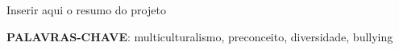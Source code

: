 
\setlength{\absparsep}{18pt} %
\begin{resumo}
	Inserir aqui o resumo do projeto
	
	\textbf{PALAVRAS-CHAVE}: multiculturalismo, preconceito, diversidade, bullying
\end{resumo}


\listoffigures*
\clearpage


\tableofcontents*
\clearpage

